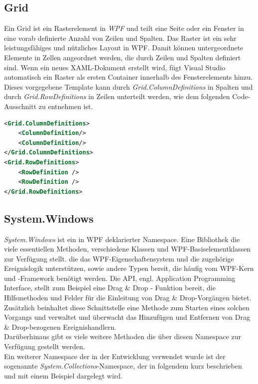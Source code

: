 \subsection*{Grid}
Ein Grid ist ein Rasterelement in \textit{WPF} und teilt eine Seite oder ein Fenster in eine vorab definierte Anzahl von Zeilen und Spalten.
Das Raster ist ein sehr leistungsfähiges und nützliches Layout in WPF. 
Damit können untergeordnete Elemente in Zellen angeordnet werden, die durch Zeilen und Spalten definiert sind. 
Wenn ein neues XAML-Dokument erstellt wird, fügt Visual Studio automatisch ein Raster als ersten Container innerhalb des 
Fensterelements hinzu. Dieses vorgegebene Template kann durch \textit{Grid.ColumnDefinitions} in Spalten und durch \textit{Grid.RowDefinitions} 
in Zeilen unterteilt werden, wie dem folgenden Code-Ausschnitt zu entnehmen ist. \cite{wpftutorial.2020a}
\begin{lstlisting}[language=XML,
    frame=single,           % Ein Rahmen um den Code
    framexleftmargin=15pt,  % Rahmen link von den Zahlen
    style=algoBericht,
    label={gridtemplate},
    captionpos=b,           % Caption unter den Code setzen
caption={Grid-Template}]
<Grid.ColumnDefinitions>
	<ColumnDefinition/>
	<ColumnDefinition/>
</Grid.ColumnDefinitions>
<Grid.RowDefinitions>
	<RowDefinition />
	<RowDefinition />
</Grid.RowDefinitions>
\end{lstlisting}

\subsection{System.Windows}
\textit{System.Windows} ist ein in WPF deklarierter Namespace. Eine Bibliothek die viele essentiellen Methoden, verschiedene Klassen und 
WPF-Basiselementklassen zur Verfügung stellt. \cite{wpfmicrosoftwindow.2020a}
die das WPF-Eigenschaftensystem 
und die zugehörige Ereignislogik unterstützen, sowie andere Typen bereit, die häufig vom WPF-Kern und -Framework benötigt werden.
Die API, engl. Application Programming Interface, stellt zum Beispiel eine Drag \& Drop - Funktion bereit, die Hilfsmethoden und Felder für die Einleitung 
von Drag \& Drop-Vorgängen bietet. Zusätzlich beinhaltet diese Schnittstelle eine Methode zum Starten eines solchen Vorgangs und verwaltet 
und überwacht das Hinzufügen und Entfernen von Drag \& Drop-bezogenen Ereignishandlern.
\\Darüberhinaus gibt es viele weitere Methoden die über diesen Namespace zur Verfügung gestellt werden. 
\\Ein weiterer Namespace der in der Entwicklung verwendet wurde ist der sogenannte \textit{System.Collections}-Namespace, der in folgendem 
kurz beschrieben und mit einem Beispiel dargelegt wird.
